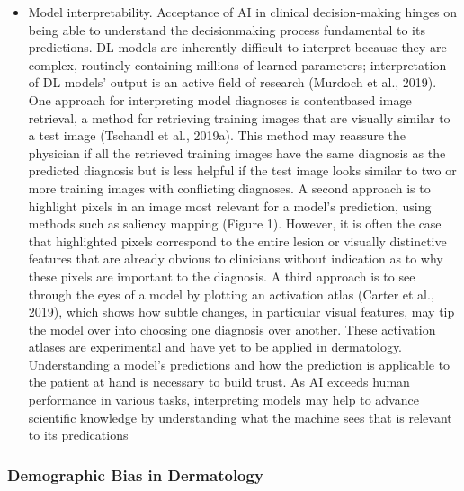 \documentclass[12pt, a4paper, oneside]{book}   	%
\begin{document}
\begin{itemize}
				\item Model interpretability. Acceptance of \gls{AI} in clinical decision-making hinges on being able to understand the decisionmaking process fundamental to its predictions. DL models are inherently difficult to interpret because they are complex, routinely containing millions of learned parameters; interpretation of DL models’ output is an active field of research (Murdoch et al., 2019). One approach for interpreting model diagnoses is contentbased image retrieval, a method for retrieving training images that are visually similar to a test image (Tschandl et al., 2019a). This method may reassure the physician if all the retrieved training images have the same diagnosis as the predicted diagnosis but is less helpful if the test image looks similar to two or more training images with conflicting diagnoses. A second approach is to highlight pixels in an image most relevant for a model’s prediction, using methods such as saliency mapping (Figure 1). However, it is often the case that highlighted pixels correspond to the entire lesion or visually distinctive features that are already obvious to clinicians without indication as to why these pixels are important to the diagnosis. A third approach is to see through the eyes of a model by plotting an activation atlas (Carter et al., 2019), which shows how subtle changes, in particular visual features, may tip the model over into choosing one diagnosis over another. These activation atlases are experimental and have yet to be applied in dermatology. Understanding a model’s predictions and how the prediction is applicable to the patient at hand is necessary to build trust. As \gls{AI} exceeds human performance in various tasks, interpreting models may help to advance scientific knowledge by understanding what the machine sees that is relevant to its predications \autocite{Young_2020}
			\end{itemize}
		\subsubsection{Demographic Bias in Dermatology}
\end{document}
